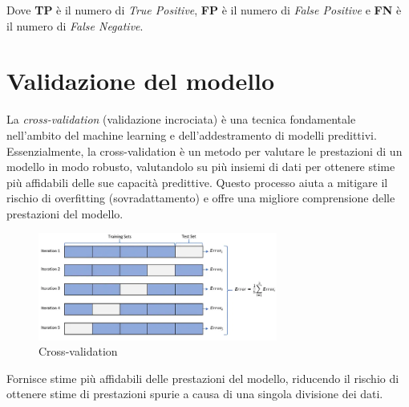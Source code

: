 Dove \textbf{TP} è il numero di \textit{True Positive}, \textbf{FP} è il numero di \textit{False Positive} e \textbf{FN} è il numero di \textit{False Negative}.

\section{Validazione del modello}

La \textit{cross-validation} (validazione incrociata) è una tecnica fondamentale nell'ambito del machine learning e dell'addestramento di modelli predittivi. Essenzialmente, la cross-validation è un metodo per valutare le prestazioni di un modello in modo robusto, valutandolo su più insiemi di dati per ottenere stime più affidabili delle sue capacità predittive. Questo processo aiuta a mitigare il rischio di overfitting (sovradattamento) e offre una migliore comprensione delle prestazioni del modello.


\begin{figure}[H]
    \centering
    \includegraphics[width=0.7\textwidth]{Immagini/cross_validation.png}
    \caption{Cross-validation}
    \label{fig:cross_validation}
\end{figure}

Fornisce stime più affidabili delle prestazioni del modello, riducendo il rischio di ottenere stime di prestazioni spurie a causa di una singola divisione dei dati.




